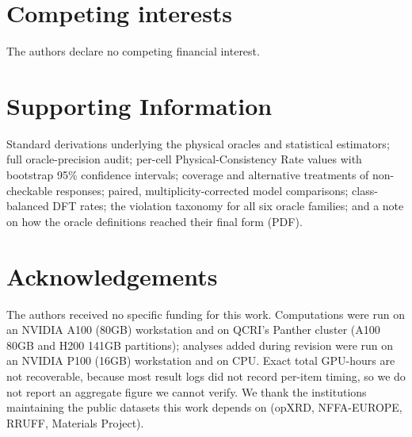 \documentclass[pdflatex,sn-nature]{sn-jnl}
\newcommand{\rev}[1]{#1}
\newcommand{\rev}[1]{{\color{blue}#1}}
\begin{document}
\section*{Competing interests}
The authors declare no competing financial interest.

\section*{Supporting Information}
Standard derivations underlying the physical oracles and statistical estimators;
full oracle-precision audit; per-cell Physical-Consistency Rate values with
bootstrap 95\% confidence intervals\rev{; coverage and alternative treatments of non-checkable
responses; paired, multiplicity-corrected model comparisons; class-balanced DFT rates; the violation
taxonomy for all six oracle families; and a note on how the oracle definitions reached their final
form} (PDF).

\section*{Acknowledgements}
The authors received no specific funding for this work.
\rev{Computations were run on an NVIDIA A100 (80GB) workstation and on QCRI's Panther cluster (A100 80GB and H200 141GB partitions)}\rev{; analyses added during revision were run on an NVIDIA P100 (16GB) workstation and on CPU}. \rev{Exact total GPU-hours are not recoverable, because most result logs did not record per-item timing, so we do not report an aggregate figure we cannot verify.} We thank the institutions maintaining the public datasets this work depends on (opXRD, NFFA-EUROPE, RRUFF, Materials Project).


\end{document}
